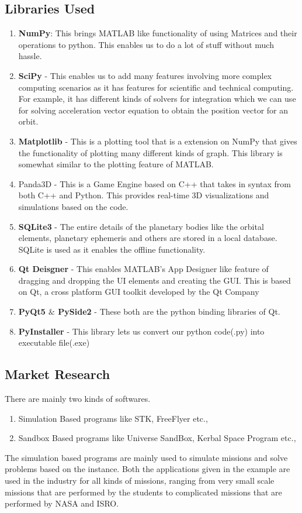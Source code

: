 \documentclass[12pt]{article}
\begin{document}
\subsection{Libraries Used}
\begin{enumerate}
\item \textbf{NumPy}:  This brings MATLAB like functionality of using Matrices and their operations to python. This enables us to do a lot of stuff without much hassle.
\item \textbf{SciPy} - This enables us to add many features involving more complex computing scenarios as it has features for scientific and technical computing. For example, it has different kinds of solvers for integration which we can use for solving acceleration vector equation to obtain the position vector for an orbit.
\item \textbf{Matplotlib} - This is a plotting tool that is a extension on NumPy that gives the functionality of plotting many different kinds of graph. This library is somewhat similar to the plotting feature of MATLAB.
\item Panda3D - This is a Game Engine based on C++ that takes in syntax from both C++ and Python. This provides real-time 3D visualizations and simulations based on the code.
\item \textbf{SQLite3} - The entire details of the planetary bodies like the orbital elements, planetary ephemeris and others are stored in a local database. SQLite is used as it enables the offline functionality.
\item \textbf{Qt Deisgner} - This enables MATLAB's App Designer like feature of dragging and dropping the UI elements and creating the GUI. This is based on Qt, a cross platform GUI toolkit developed by the Qt Company
\item \textbf{PyQt5 $\&$ PySide2} - These both are the python binding libraries of Qt.
\item \textbf{PyInstaller} - This library lets us convert our python code(.py) into executable file(.exe)
\end{enumerate}
\subsection{Market Research}
There are mainly two kinds of softwares.
\begin{enumerate}
\item Simulation Based programs like STK, FreeFlyer etc.,
\item Sandbox Based programs like Universe SandBox, Kerbal Space Program etc.,
\end{enumerate}
\hspace{4em}The simulation based programs are mainly used to simulate missions and solve problems based on the instance. Both the applications given in the example are used in the industry for all kinds of missions, ranging from very small scale missions that are performed by the students to complicated missions that are performed by NASA and ISRO.
\end{document}
